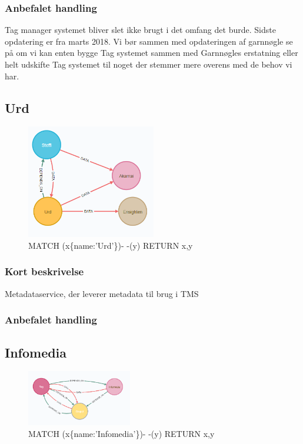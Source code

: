 \documentclass{article}
\begin{document}
\subsubsection{Anbefalet handling}
Tag manager systemet bliver slet ikke brugt i det omfang det burde. Sidste opdatering er fra marts 2018. Vi bør sammen med opdateringen af garnnøgle se på om vi kan enten bygge Tag systemet sammen med Garnnøgles erstatning eller helt udskifte Tag systemet til noget der stemmer mere overens med de behov vi har.



\subsection{Urd}
\begin{figure}[h]
\includegraphics[width=160pt]{Urd.PNG}
\caption{MATCH (x\{name:'Urd'\})- -(y) RETURN x,y}
\end{figure}
\subsubsection{Kort beskrivelse}
Metadataservice, der leverer metadata til brug i TMS
\subsubsection{Anbefalet handling}



\subsection{Infomedia}
\begin{figure}[h]
\includegraphics[width=130pt]{Infomedia.PNG}
\caption{MATCH (x\{name:'Infomedia'\})- -(y) RETURN x,y}
\end{figure}
\end{document}
